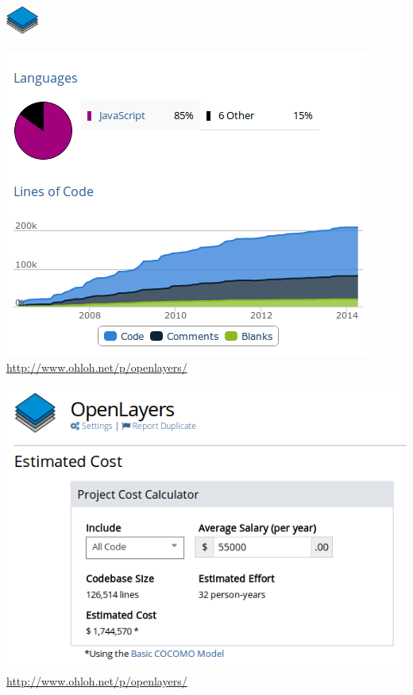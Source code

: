 \begin{frame} %
\begin{center}
\begin{flushright}
    \includegraphics[width=0.08\textwidth]{imgs/ol.png}
\end{flushright}

 {
    \includegraphics[width=.7\textwidth]{imgs/ol-ohloh-code.png}
    \url{http://www.ohloh.net/p/openlayers/}
}

 {
    \includegraphics[width=.7\textwidth]{imgs/ol-ohloh-costs.png}
    \url{http://www.ohloh.net/p/openlayers/}
}


\end{center}
\end{frame}
